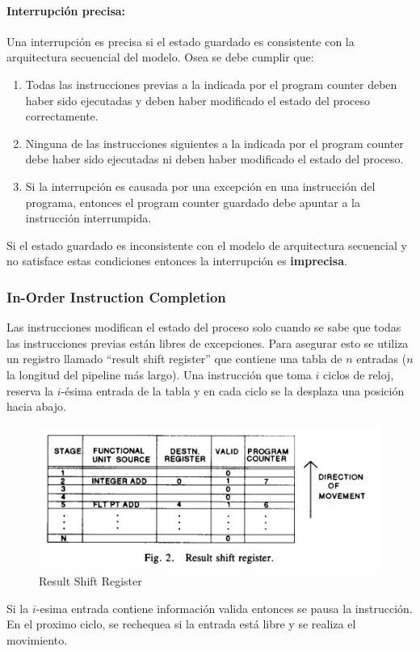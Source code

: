 \paragraph{Interrupción precisa:} Una interrupción es precisa si el estado guardado es consistente con la arquitectura secuencial del modelo. Osea se debe cumplir que:
\begin{enumerate}
	\item Todas las instrucciones previas a la indicada por el program counter deben haber sido ejecutadas y deben haber modificado el estado del proceso correctamente.
	\item Ninguna de las instrucciones siguientes a la indicada por el program counter debe haber sido ejecutadas ni deben haber modificado el estado del proceso.
	\item Si la interrupción es causada por una excepción en una instrucción del programa, entonces el program counter guardado debe apuntar a la instrucción interrumpida.
\end{enumerate}

Si el estado guardado es inconsistente con el modelo de arquitectura secuencial y no satisface estas condiciones entonces la interrupción es \textbf{imprecisa}. 

\subsubsection{In-Order Instruction Completion}
Las instrucciones modifican el estado del proceso solo cuando se sabe que todas las instrucciones previas están libres de excepciones. Para asegurar esto se utiliza un registro llamado ``result shift register'' que contiene una tabla de $n$  entradas ($n$ la longitud del pipeline más largo). Una instrucción que toma $i$ ciclos de reloj, reserva la $i$-ésima entrada de la tabla y en cada ciclo se la desplaza una posición hacia abajo.
\begin{figure}[ht]
	\centering
	\includegraphics[width=0.5\linewidth]{imagenes/shift-register}
	\caption{Result Shift Register}
	\label{fig:shiftregister}
\end{figure}

Si la $i$-esima entrada contiene información valida entonces se pausa la instrucción. En el proximo ciclo, se rechequea si la entrada está libre y se realiza el movimiento.

